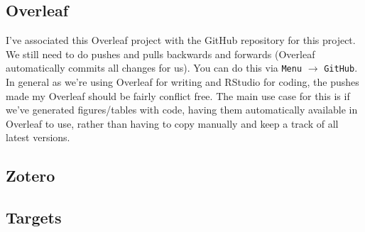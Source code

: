 \documentclass[12pt]{article}
\begin{document}
\subsection{Overleaf}
I've associated this Overleaf project with the GitHub repository for this project. We still need to do pushes and pulls backwards and forwards (Overleaf automatically commits all changes for us). You can do this via \texttt{Menu} $\rightarrow$ \texttt{GitHub}. In general as we're using Overleaf for writing and RStudio for coding, the pushes made my Overleaf should be fairly conflict free. The main use case for this is if we've generated figures/tables with code, having them automatically available in Overleaf to use, rather than having to copy manually and keep a track of all latest versions.
\subsection{Zotero}
\subsection{Targets}




% 

% 
\end{document}
